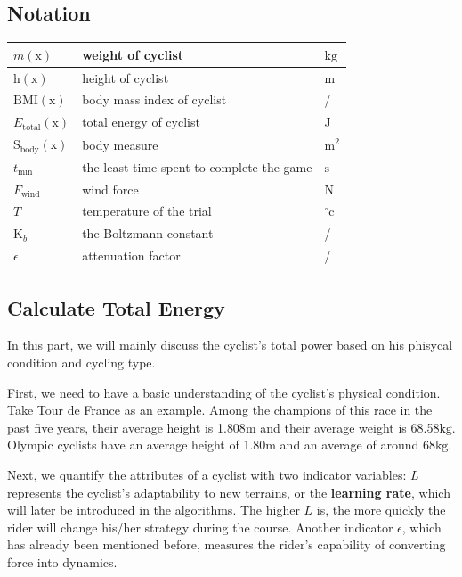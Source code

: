 \documentclass[12pt]{article}
\theoremstyle{definition}
\theoremstyle{remark}
\numberwithin{equation}{section}
\begin{document}
	\subsection{Notation}
	\begin{tabular}{|l|l|l|}
		\hline
		$m(\mathrm{x})$&weight of cyclist&$\mathrm{kg}$\\
		\hline
		$\mathrm{h}(\mathrm{x})$&height of cyclist&$\mathrm{m}$\\
		\hline
		$\mathrm{BMI}(\mathrm{x})$&body mass index of cyclist&/\\
		\hline
		$E_\mathrm{total} (\mathrm{x})$&total energy of cyclist&$\mathrm{J}$\\
		\hline
		$\mathrm{S}_\mathrm{body}(\mathrm{x})$&body measure&$\mathrm{m}^2$\\
		\hline
		$t_\mathrm{min}$&the least time spent to complete the game&$\mathrm{s}$\\
		\hline
		$F_\mathrm{wind}$&wind force&$\mathrm{N}$\\
		\hline
		$T$&temperature of the trial&$^{\circ}\mathrm{c}$\\
		\hline
		$\mathrm{K}_b$&the Boltzmann constant&/\\
		\hline
		$\epsilon$&attenuation factor&/\\
		\hline
	\end{tabular}
	\subsection{Calculate Total Energy}
	In this part, we will mainly discuss the cyclist's total power based on his phisycal condition and cycling type. 

	First, we need to have a basic understanding of the cyclist's physical condition. Take Tour de France as an example\cite{france}. Among the champions of this race in the past five years, their average height is 1.808$\mathrm{m}$ and their average weight is 68.58$\mathrm{kg}$. Olympic cyclists have an average height of 1.80$\mathrm{m}$ and an average of around 68$\mathrm{kg}$\cite{weight}. 

	Next, we quantify the attributes of a cyclist with two indicator variables: \(L\) represents the cyclist's adaptability to new terrains, or the \textbf{learning rate}, which will later be introduced in the algorithms. The higher \(L\) is, the more quickly the rider will change his/her strategy during the course. Another indicator \(\epsilon\), which has already been mentioned before, measures the rider's capability of converting force into dynamics.
\end{document}
